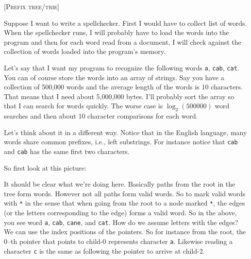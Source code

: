 \textsc{[Prefix tree/trie]}

Suppose I want to write a spellchecker.
First I would have to collect list of words.
When the spellchecker runs, I will probably have to load the words
into the program and then for each word read from a document,
I will check against the collection of words loaded into the
program's memory.

Let's say that I want my program to recognize the following words
\verb!a!, \verb!cab!, \verb!cat!.
You can of course store the words into an array of strings.
Say you have a collection of 500,000 words and the 
average length of the words is 10 characters.
That means that I need about 5,000,000 bytes.
I'll probably sort the array so that I can search for 
words quickly.
The worse case is $\log_2(500000)$ word searches and then 
about 10 character comparisons for each word.

Let's think about it in a different way.
Notice that in the English language,
many words share common prefixes, i.e., left substrings.
For instance notice that 
\verb!cab! and \verb!cab!
has the same first two characters.

So first look at this picture:


It should be clear what we're doing here.
Basically paths from the root in the tree form words.
However not all paths form valid words.
So to mark valid words with \texttt{*} in the sense that
when going from the root to a node marked \texttt{*},
the edges (or the letters corresponding to the edge) forms a valid word.
So in the above, you see word
\texttt{a},
\texttt{cab},
\texttt{cane}, and
\texttt{cat}.
How do we assume letters with the edges?
We can use the index positions of the pointers.
So for instance from the root, the 0--th pointer that points to child-0
represents character \verb!a!.
Likewise reading a character \verb!c! is the same as 
following the pointer to arrive at child-2.

